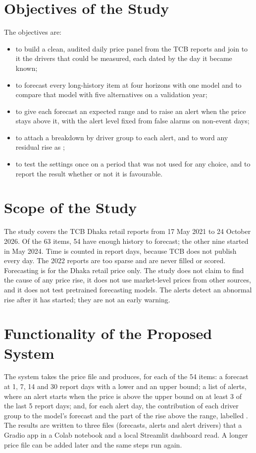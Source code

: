 \section{Objectives of the Study}
The objectives are:
\begin{itemize}
    \item to build a clean, audited daily price panel from the TCB reports and join to it the drivers that could be measured, each dated by the day it became known;
    \item to forecast every long-history item at four horizons with one model and to compare that model with five alternatives on a validation year;
    \item to give each forecast an expected range and to raise an alert when the price stays above it, with the alert level fixed from false alarms on non-event days;
    \item to attach a breakdown by driver group to each alert, and to word any residual rise as \unexpl;
    \item to test the settings once on a period that was not used for any choice, and to report the result whether or not it is favourable.
\end{itemize}

\section{Scope of the Study}
The study covers the TCB Dhaka retail reports from 17 May 2021 to 24 October 2026. Of the 63 items, 54 have enough history to forecast; the other nine started in May 2024. Time is counted in report days, because TCB does not publish every day. The 2022 reports are too sparse and are never filled or scored. Forecasting is for the Dhaka retail price only. The study does not claim to find the cause of any price rise, it does not use market-level prices from other sources, and it does not test pretrained forecasting models. The alerts detect an abnormal rise after it has started; they are not an early warning.

\section{Functionality of the Proposed System}
The system takes the price file and produces, for each of the 54 items: a forecast at 1, 7, 14 and 30 report days with a lower and an upper bound; a list of alerts, where an alert starts when the price is above the upper bound on at least 3 of the last 5 report days; and, for each alert day, the contribution of each driver group to the model's forecast and the part of the rise above the range, labelled \unexpl. The results are written to three files (forecasts, alerts and alert drivers) that a Gradio app in a Colab notebook and a local Streamlit dashboard read. A longer price file can be added later and the same steps run again.

